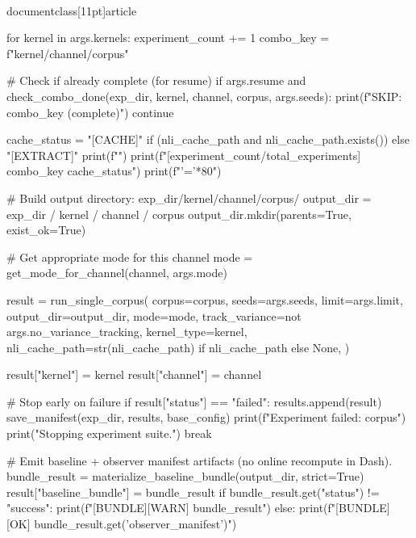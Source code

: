 \\documentclass[11pt]{article}
\begin{document}
\begin{CodeBlock}
            for kernel in args.kernels:
                experiment_count += 1
                combo_key = f"{kernel}/{channel}/{corpus}"
                
                # Check if already complete (for resume)
                if args.resume and check_combo_done(exp_dir, kernel, channel, corpus, args.seeds):
                    print(f" SKIP: {combo_key} (complete)")
                    continue
                
                cache_status = "[CACHE]" if (nli_cache_path and nli_cache_path.exists()) else "[EXTRACT]"
                print(f"")
                print(f"[{experiment_count}/{total_experiments}] {combo_key} {cache_status}")
                print(f"{'='*80}")
                
                # Build output directory: exp_dir/kernel/channel/corpus/
                output_dir = exp_dir / kernel / channel / corpus
                output_dir.mkdir(parents=True, exist_ok=True)
                
                # Get appropriate mode for this channel
                mode = get_mode_for_channel(channel, args.mode)
                
                result = run_single_corpus(
                    corpus=corpus,
                    seeds=args.seeds,
                    limit=args.limit,
                    output_dir=output_dir,
                    mode=mode,
                    track_variance=not args.no_variance_tracking,
                    kernel_type=kernel,
                    nli_cache_path=str(nli_cache_path) if nli_cache_path else None,
                )
                
                result["kernel"] = kernel
                result["channel"] = channel

                # Stop early on failure
                if result["status"] == "failed":
                    results.append(result)
                    save_manifest(exp_dir, results, base_config)
                    print(f"\n Experiment failed: {corpus}")
                    print("Stopping experiment suite.")
                    break

                # Emit baseline + observer manifest artifacts (no online recompute in Dash).
                bundle_result = materialize_baseline_bundle(output_dir, strict=True)
                result["baseline_bundle"] = bundle_result
                if bundle_result.get("status") != "success":
                    print(f"[BUNDLE][WARN] {bundle_result}")
                else:
                    print(f"[BUNDLE][OK] {bundle_result.get('observer_manifest')}")


\end{CodeBlock}
\end{document}
